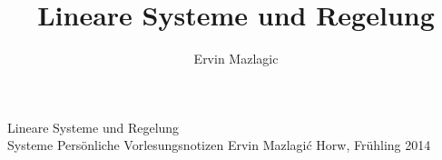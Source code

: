 \documentclass[a4paper,
               10pt,
               fleqn]{article}
\author{Ervin Mazlagic}
\title{Lineare Systeme und Regelung}
\begin{document}
	 {Lineare Systeme und Regelung\\ Systeme}
         {Persönliche Vorlesungsnotizen}
         {Ervin Mazlagi\'c}
         {Horw, Frühling 2014}

\tableofcontents
\newpage

 
	 
\end{document}
